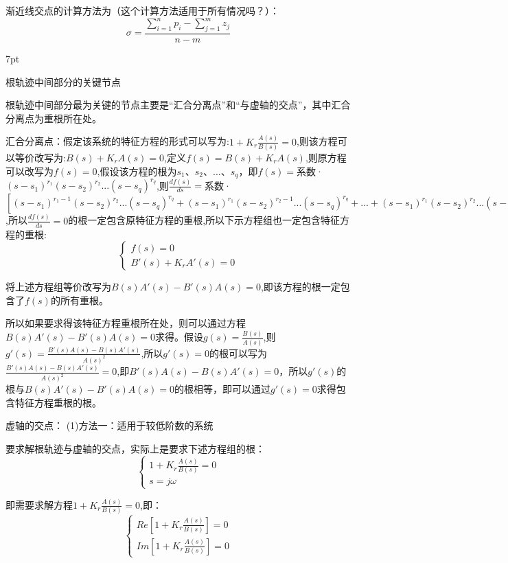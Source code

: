 \documentclass{article}
\numberwithin{equation}{section}
\numberwithin{figure}{section}
\newenvironment{formal}{%
\def\FrameCommand{%
\hspace{1pt}%
{\color{DarkBlue}\vrule width 2pt}%
{\color{formalshade}\vrule width 4pt}%
\colorbox{formalshade}%
}%
\MakeFramed{\advance\hsize-\width\FrameRestore}%
\noindent\hspace{-4.55pt}%
\begin{adjustwidth}{}{7pt}%
\vspace{2pt}\vspace{2pt}%
}
{%
\vspace{2pt}\end{adjustwidth}\endMakeFramed%
}
\begin{document}
渐近线交点的计算方法为（这个计算方法适用于所有情况吗？）：
\begin{equation}
    \sigma=\frac{\sum_{i=1}^{n}p_i-\sum_{j=1}^{m}z_j}{n-m}
\end{equation}

\begin{formal}
    根轨迹中间部分的关键节点
\end{formal}

根轨迹中间部分最为关键的节点主要是“汇合分离点”和“与虚轴的交点”，其中汇合分离点为重根所在处。

汇合分离点：假定该系统的特征方程的形式可以写为:$1+K_r\frac{A(s)}{B(s)}=0$,则该方程可以等价改写为:$B(s)+K_rA(s)=0$,定义$f(s)=B(s)+K_rA(s)$,则原方程可以改写为$f(s)=0$,假设该方程的根为$s_1$、$s_2$、...、$s_q$，即$f(s)=$系数·$(s-s_1)^{r_1}(s-s_2)^{r_2}...(s-s_q)^{r_q}$,则$\frac{df(s)}{ds}=$系数·$[(s-s_1)^{r_1-1}(s-s_2)^{r_2}...(s-s_q)^{r_q}+(s-s_1)^{r_1}(s-s_2)^{r_2-1}...(s-s_q)^{r_q}+...+(s-s_1)^{r_1}(s-s_2)^{r_2}...(s-s_q)^{r_q-1}]$,所以$\frac{df(s)}{ds}=0$的根一定包含原特征方程的重根,所以下示方程组也一定包含特征方程的重根:
\begin{equation}
    \begin{cases}
       f(s)=0\\
       B'(s)+K_rA'(s)=0
    \end{cases}
\end{equation}

将上述方程组等价改写为$B(s)A'(s)-B'(s)A(s)=0$,即该方程的根一定包含了$f(s)$的所有重根。

所以如果要求得该特征方程重根所在处，则可以通过方程$B(s)A'(s)-B'(s)A(s)=0$求得。假设$g(s)=\frac{B(s)}{A(s)}$,则$g'(s)=\frac{B'(s)A(s)-B(s)A'(s)}{A(s)^2}$,所以$g'(s)=0$的根可以写为$\frac{B'(s)A(s)-B(s)A'(s)}{A(s)^2}=0$,即$B'(s)A(s)-B(s)A'(s)=0$，所以$g'(s)$的根与$B(s)A'(s)-B'(s)A(s)=0$的根相等，即可以通过$g'(s)=0$求得包含特征方程重根的根。

虚轴的交点：
(1)方法一：适用于较低阶数的系统

要求解根轨迹与虚轴的交点，实际上是要求下述方程组的根：
\begin{equation}
    \begin{cases}
        1+K_r\frac{A(s)}{B(s)}=0\\
        s=j\omega
    \end{cases}
\end{equation}

即需要求解方程$1+K_r\frac{A(s)}{B(s)}=0$,即：
\begin{equation}
    \begin{cases}
        Re[1+K_r\frac{A(s)}{B(s)}]=0\\
        Im[1+K_r\frac{A(s)}{B(s)}]=0
    \end{cases}
\end{equation}
\end{document}
